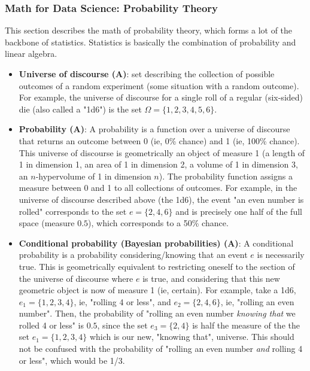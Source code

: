 \documentclass{article}
\begin{document}
\subsubsection*{Math for Data Science: Probability Theory}

This section describes the math of probability theory, which forms a lot of the backbone of statistics. Statistics is basically the combination of probability and linear algebra.

\begin{itemize}
    \item \textbf{Universe of discourse (A)}: set describing the collection of possible outcomes of a random experiment (some situation with a random outcome). For example, the universe of discourse for a single roll of a regular (six-sided) die (also called a "1d6") is the set $\Omega = \{ 1, 2, 3, 4, 5, 6 \}$.
    
    \item \textbf{Probability (A)}: A probability is a function over a universe of discourse that returns an outcome between 0 (ie, 0\% chance) and 1 (ie, 100\% chance). This universe of discourse is geometrically an object of measure 1 (a length of 1 in dimension 1, an area of 1 in dimension 2, a volume of 1 in dimension 3, an $n$-hypervolume of 1 in dimension $n$). The probability function assigns a measure between 0 and 1 to all collections of outcomes. For example, in the universe of discourse described above (the 1d6), the event "an even number is rolled" corresponds to the set $e = \{ 2, 4, 6 \}$ and is precisely one half of the full space (measure $0.5$), which corresponds to a 50\% chance.
    
    \item \textbf{Conditional probability (Bayesian probabilities) (A)}: A conditional probability is a probability considering/knowing that an event $e$ is necessarily true. This is geometrically equivalent to restricting oneself to the section of the universe of discourse where $e$ is true, and considering that this new geometric object is now of measure 1 (ie, certain). For example, take a 1d6, $e_1 = \{ 1, 2, 3, 4 \}$, ie, "rolling 4 or less", and $e_2 = \{ 2, 4, 6 \}$, ie, "rolling an even number". Then, the probability of "rolling an even number \textit{knowing that} we rolled 4 or less" is $0.5$, since the set $e_3 = \{ 2, 4 \}$ is half the measure of the the set $e_1 = \{ 1, 2, 3, 4 \}$ which is our new, "knowing that", universe. This should not be confused with the probability of "rolling an even number \textit{and} rolling 4 or less", which would be 1/3.
    

\end{itemize}
\end{document}
